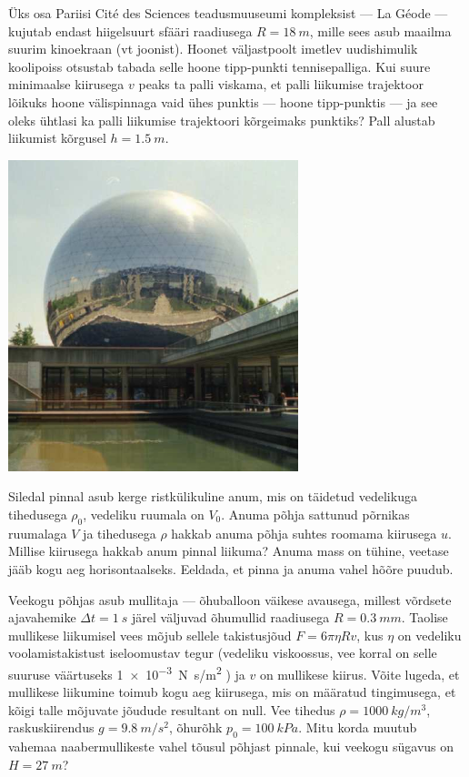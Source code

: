\documentclass[10pt]{article}
\begin{document}
{
Üks osa Pariisi Cité des Sciences teadusmuuseumi kompleksist --- La Géode --- kujutab endast hiigelsuurt sfääri raadiusega $R = \SI{18}{m}$, mille sees asub maailma suurim kinoekraan (vt joonist). Hoonet väljastpoolt imetlev uudishimulik koolipoiss otsustab tabada selle hoone tipp-punkti tennisepalliga. Kui suure minimaalse kiirusega $v$ peaks ta palli viskama, et palli liikumise trajektoor lõikuks hoone välispinnaga vaid ühes punktis --- hoone tipp-punktis --- ja see oleks ühtlasi ka palli liikumise trajektoori kõrgeimaks punktiks? Pall alustab liikumist kõrgusel $h = \SI{1,5}{m}$.

\begin{center}
	\includegraphics[width=0.5\linewidth]{2005-lahg-06-yl}
\end{center}
\probend
\bigskip


Siledal pinnal asub kerge ristkülikuline anum, mis on täidetud vedelikuga tihedusega $\rho_0$, vedeliku ruumala on $V_0$. Anuma põhja sattunud põrnikas ruumalaga $V$ ja tihedusega $\rho$ hakkab anuma põhja suhtes roomama kiirusega $u$. Millise kiirusega hakkab anum pinnal liikuma? Anuma mass on tühine, veetase jääb kogu aeg horisontaalseks. Eeldada, et pinna ja anuma vahel hõõre puudub.
\probend
\bigskip


Veekogu põhjas asub mullitaja --- õhuballoon väikese avausega, millest võrdsete ajavahemike $\Delta t = \SI{1}{s}$ järel väljuvad õhumullid raadiusega $R = \SI{0,3}{mm}$. Taolise mullikese liikumisel vees mõjub sellele takistusjõud $F = 6\pi \eta Rv$, kus $\eta$ on vedeliku voolamistakistust iseloomustav tegur (vedeliku viskoossus, vee korral on selle suuruse väärtuseks \SI{1e-3}{N.s/m^2} ) ja $v$ on mullikese kiirus. Võite lugeda, et mullikese liikumine toimub kogu aeg kiirusega, mis on määratud tingimusega, et kõigi talle mõjuvate jõudude resultant on null. Vee tihedus $\rho = \SI{1000}{kg/m^3}$, raskuskiirendus $g = \SI{9,8}{m/s^2}$, õhurõhk $p_0 = \SI{100}{kPa}$. Mitu korda muutub vahemaa naabermullikeste vahel tõusul põhjast pinnale, kui veekogu sügavus on $H = \SI{27}{m}$?
\probend
\bigskip

}
\end{document}
